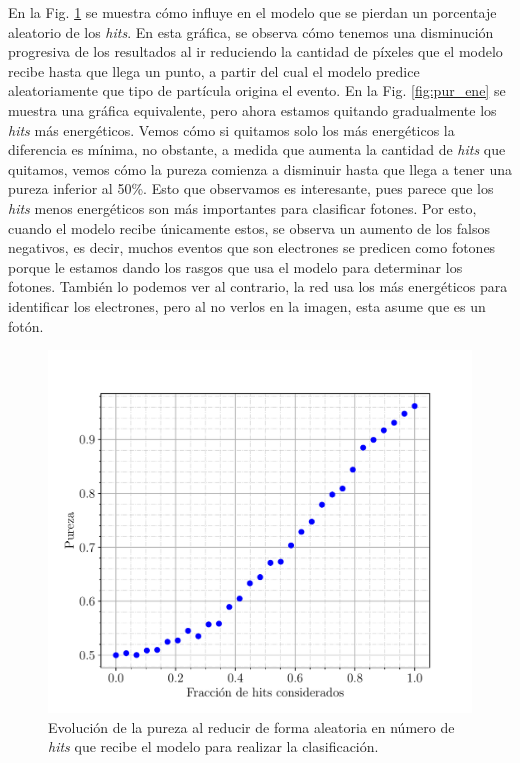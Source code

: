 \documentclass[a4paper,12pt,oneside,titlepage]{book}
\begin{document}
En la Fig. \ref{fig:pur_alea} se muestra cómo influye en el modelo que se pierdan un porcentaje aleatorio de los \textit{hits}. En esta gráfica, se observa cómo tenemos una disminución progresiva de los resultados al ir reduciendo la cantidad de píxeles que el modelo recibe hasta que llega un punto, a partir del cual el modelo predice aleatoriamente que tipo de partícula origina el evento. En la Fig. \ref{fig:pur_ene} se muestra una gráfica equivalente, pero ahora estamos quitando gradualmente los \textit{hits} más energéticos. Vemos cómo si quitamos solo los más energéticos la diferencia es mínima, no obstante, a medida que aumenta la cantidad de \textit{hits} que quitamos, vemos cómo la pureza comienza a disminuir hasta que llega a tener una pureza inferior al 50\%. Esto que observamos es interesante, pues parece que los \textit{hits} menos energéticos son más importantes para clasificar fotones. Por esto, cuando el modelo recibe únicamente estos, se observa un aumento de los falsos negativos, es decir, muchos eventos que son electrones se predicen como fotones porque le estamos dando los rasgos que usa el modelo para determinar los fotones. También lo podemos ver al contrario, la red usa los más energéticos para identificar los electrones, pero al no verlos en la imagen, esta asume que es un fotón.

\begin{figure}[h!]
  \centering
  \includegraphics[scale=0.59, center]{pureza_alea.pdf}
  \caption{Evolución de la pureza al reducir de forma aleatoria en número de \textit{hits} que recibe el modelo para realizar la clasificación.}
  \label{fig:pur_alea}
\end{figure}
\end{document}
